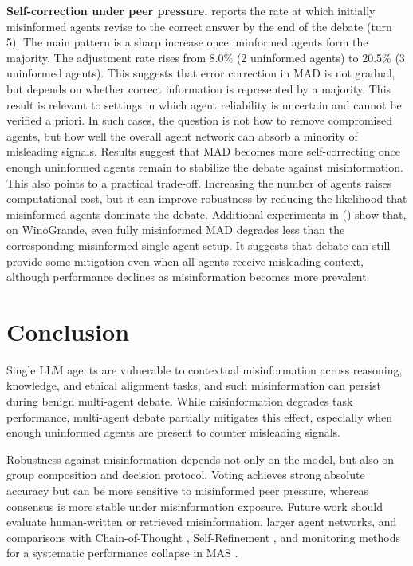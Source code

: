 \documentclass[11pt]{article}
\begin{document}
\noindent\textbf{Self-correction under peer pressure.} 
 reports the rate at which initially misinformed agents revise to the correct answer by the end of the debate (turn 5). 
The main pattern is a sharp increase once uninformed agents form the majority.
The adjustment rate rises from 8.0\% (2 uninformed agents) to 20.5\% (3 uninformed agents). 
This suggests that error correction in MAD is not gradual, but depends on whether correct information is represented by a majority.
This result is relevant to settings in which agent reliability is uncertain and cannot be verified a priori. 
In such cases, the question is not how to remove compromised agents, but how well the overall agent network can absorb a minority of misleading signals.
Results suggest that MAD becomes more self-correcting once enough uninformed agents remain to stabilize the debate against misinformation.
This also points to a practical trade-off. 
Increasing the number of agents raises computational cost, but it can improve robustness by reducing the likelihood that misinformed agents dominate the debate.
Additional experiments in  () show that, on WinoGrande, even fully misinformed MAD degrades less than the corresponding misinformed single-agent setup.
It suggests that debate can still provide some mitigation even when all agents receive misleading context, although performance declines as misinformation becomes more prevalent.

\section{Conclusion}

Single LLM agents are vulnerable to contextual misinformation across reasoning, knowledge, and ethical alignment tasks, and such misinformation can persist during benign multi-agent debate. While misinformation degrades task performance, multi-agent debate partially mitigates this effect, especially when enough uninformed agents are present to counter misleading signals.

Robustness against misinformation depends not only on the model, but also on group composition and decision protocol. Voting achieves strong absolute accuracy but can be more sensitive to misinformed peer pressure, whereas consensus is more stable under misinformation exposure. Future work should evaluate human-written or retrieved misinformation, larger agent networks, and comparisons with Chain-of-Thought \citep{wei2022chain}, Self-Refinement \citep{NEURIPS2023_91edff07}, and monitoring methods for a systematic performance collapse in MAS \citep{BeckerKSW25}.
\end{document}
